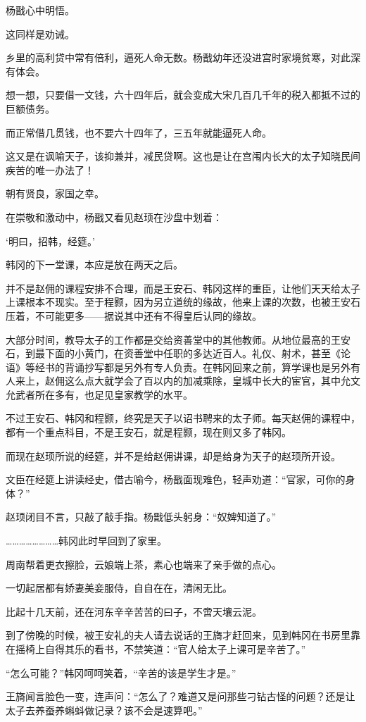 杨戬心中明悟。

这同样是劝诫。

乡里的高利贷中常有倍利，逼死人命无数。杨戬幼年还没进宫时家境贫寒，对此深有体会。

想一想，只要借一文钱，六十四年后，就会变成大宋几百几千年的税入都抵不过的巨额债务。

而正常借几贯钱，也不要六十四年了，三五年就能逼死人命。

这又是在讽喻天子，该抑兼并，减民贷啊。这也是让在宫闱内长大的太子知晓民间疾苦的唯一办法了！

朝有贤良，家国之幸。

在崇敬和激动中，杨戬又看见赵顼在沙盘中划着：

‘明曰，招韩，经筵。’

韩冈的下一堂课，本应是放在两天之后。

并不是赵佣的课程安排不合理，而是王安石、韩冈这样的重臣，让他们天天给太子上课根本不现实。至于程颢，因为另立道统的缘故，他来上课的次数，也被王安石压着，不可能更多——据说其中还有不得皇后认同的缘故。

大部分时间，教导太子的工作都是交给资善堂中的其他教师。从地位最高的王安石，到最下面的小黄门，在资善堂中任职的多达近百人。礼仪、射术，甚至《论语》等经书的背诵抄写都是另外有专人负责。在韩冈回来之前，算学课也是另外有人来上，赵佣这么点大就学会了百以内的加减乘除，皇城中长大的宦官，其中允文允武者所在多有，也足见皇家教学的水平。

不过王安石、韩冈和程颢，终究是天子以诏书聘来的太子师。每天赵佣的课程中，都有一个重点科目，不是王安石，就是程颢，现在则又多了韩冈。

而现在赵顼所说的经筵，并不是给赵佣讲课，却是给身为天子的赵顼所开设。

文臣在经筵上讲读经史，借古喻今，杨戬面现难色，轻声劝道：“官家，可你的身体？”

赵顼闭目不言，只敲了敲手指。杨戬低头躬身：“奴婢知道了。”

……………………韩冈此时早回到了家里。

周南帮着更衣擦脸，云娘端上茶，素心也端来了亲手做的点心。

一切起居都有娇妻美妾服侍，自自在在，清闲无比。

比起十几天前，还在河东辛辛苦苦的曰子，不啻天壤云泥。

到了傍晚的时候，被王安礼的夫人请去说话的王旖才赶回来，见到韩冈在书房里靠在摇椅上自得其乐的看书，不禁笑道：“官人给太子上课可是辛苦了。”

“怎么可能？”韩冈呵呵笑着，“辛苦的该是学生才是。”

王旖闻言脸色一变，连声问：“怎么了？难道又是问那些刁钻古怪的问题？还是让太子去养蚕养蝌蚪做记录？该不会是速算吧。”

